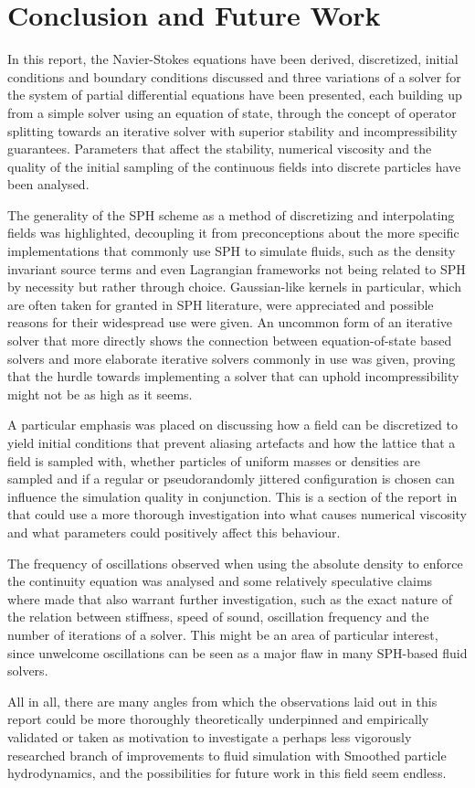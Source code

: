 
\chapter{Conclusion and Future Work}

In this report, the Navier-Stokes equations have been derived, discretized, initial conditions and boundary conditions discussed and three variations of a solver for the system of partial differential equations have been presented, each building up from a simple solver using an equation of state, through the concept of operator splitting towards an iterative solver with superior stability and incompressibility guarantees. Parameters that affect the stability, numerical viscosity and the quality of the initial sampling of the continuous fields into discrete particles have been analysed.

The generality of the SPH scheme as a method of discretizing and interpolating fields was highlighted, decoupling it from preconceptions about the more specific implementations that commonly use SPH to simulate fluids, such as the density invariant source terms and even Lagrangian frameworks not being related to SPH by necessity but rather through choice. Gaussian-like kernels in particular, which are often taken for granted in SPH literature, were appreciated and possible reasons for their widespread use were given. An uncommon form of an iterative solver that more directly shows the connection between equation-of-state based solvers and more elaborate iterative solvers commonly in use was given, proving that the hurdle towards implementing a solver that can uphold incompressibility might not be as high as it seems.

A particular emphasis was placed on discussing how a field can be discretized to yield initial conditions that prevent aliasing artefacts and how the lattice that a field is sampled with, whether particles of uniform masses or densities are sampled and if a regular or pseudorandomly jittered configuration is chosen can influence the simulation quality in conjunction. This is a section of the report in that could use a more thorough investigation into what causes numerical viscosity and what parameters could positively affect this behaviour.

The frequency of oscillations observed when using the absolute density to enforce the continuity equation was analysed and some relatively speculative claims where made that also warrant further investigation, such as the exact nature of the relation between stiffness, speed of sound, oscillation frequency and the number of iterations of a solver. This might be an area of particular interest, since unwelcome oscillations can be seen as a major flaw in many SPH-based fluid solvers.

All in all, there are many angles from which the observations laid out in this report could be more thoroughly theoretically underpinned and empirically validated or taken as motivation to investigate a perhaps less vigorously researched branch of improvements to fluid simulation with Smoothed particle hydrodynamics, and the possibilities for future work in this field seem endless.
